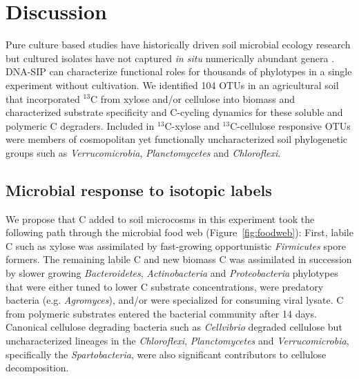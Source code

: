\section{Discussion} 
Pure culture based studies have historically driven soil microbial ecology
research but cultured isolates have not captured \textit{in situ} numerically
abundant genera \citep{Janssen2006}. DNA-SIP can
characterize functional roles for thousands of phylotypes in a single
experiment without cultivation. We identified 104 OTUs in an agricultural soil
that incorporated $^{13}$C from xylose and/or cellulose into biomass and
characterized substrate specificity and C-cycling dynamics for these soluble
and polymeric C degraders. Included in $^{13}$C-xylose and
$^{13}$C-cellulose responsive OTUs were members of cosmopolitan yet
functionally uncharacterized soil phylogenetic groups such as
\textit{Verrucomicrobia}, \textit{Planctomycetes} and \textit{Chloroflexi}.

\subsection{Microbial response to isotopic labels}
We propose that C added to soil microcosms in this experiment took the
following path through the microbial food web (Figure~\ref{fig:foodweb}):
First, labile C such as xylose was assimilated by fast-growing opportunistic
\textit{Firmicutes} spore formers. The remaining labile C and new biomass C was
assimilated in succession by slower growing \textit{Bacteroidetes},
\textit{Actinobacteria} and \textit{Proteobacteria} phylotypes that were either
tuned to lower C substrate concentrations, were predatory bacteria (e.g.
\textit{Agromyces}), and/or were specialized for consuming viral lysate. C from
polymeric substrates entered the bacterial community after 14 days. Canonical
cellulose degrading bacteria such as \textit{Cellvibrio} degraded cellulose
but uncharacterized lineages in the \textit{Chloroflexi},
\textit{Planctomycetes} and \textit{Verrucomicrobia}, specifically the
\textit{Spartobacteria}, were also significant contributors to cellulose
decomposition.

